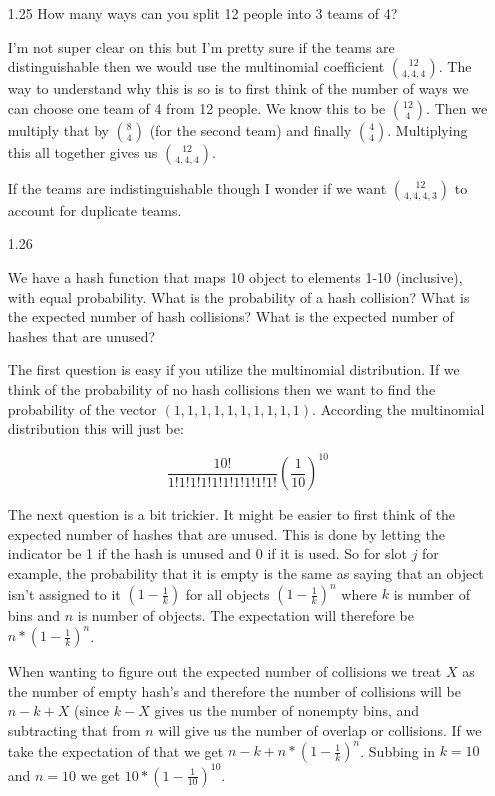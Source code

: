 \begin{enumerate}
\item[1.25]
How many ways can you split 12 people into 3 teams of 4?

I'm not super clear on this but I'm pretty sure if the teams are distinguishable then we would use the multinomial coefficient ${12 \choose 4, 4, 4}$. The way to understand why this is so is to first think of the number of ways we can choose one team of 4 from 12 people. We know this to be  ${12 \choose 4}$. Then we multiply that by  ${8 \choose 4}$ (for the second team) and finally  ${4\choose 4}$. Multiplying this all together gives us  ${12 \choose 4, 4, 4}$.

If the teams are indistinguishable though I wonder if we want ${12 \choose 4, 4, 4, 3}$ to account for duplicate teams. 


\item[1.26]

We have a hash function that maps 10 object to elements 1-10 (inclusive), with equal probability. What is the probability of a hash collision? What is the expected number of hash collisions? What is the expected number of hashes that are unused?

The first question is easy if you utilize the multinomial distribution. If we think of the probability of no hash collisions then we want to find the probability of the vector $(1,1,1,1,1,1,1,1,1,1)$. According the multinomial distribution this will just be:

\begin{equation}
\frac{10!}{1!1!1!1!1!1!1!1!1!1!} (\frac{1}{10})^{10}
\end{equation} 

The next question is a bit trickier. It might be easier to first think of the expected number of hashes that are unused. This is done by letting the indicator be 1 if the hash is unused and 0 if it is used. So for slot $j$ for example, the probability that it is empty is the same as saying that an object isn't assigned to it $(1-\frac{1}{k})$ for all objects $(1-\frac{1}{k})^n$ where $k$ is number of bins and $n$ is number of objects. The expectation will therefore be $n*(1-\frac{1}{k})^n$.

When wanting to figure out the expected number of collisions we treat $X$ as the number of empty hash's and therefore the number of collisions will be $n - k + X$ (since $k-X$ gives us the number of nonempty bins, and subtracting that from $n$ will give us the number of overlap or collisions. If we take the expectation of that we get $n - k + n*(1-\frac{1}{k})^n$. Subbing in $k=10$ and $n=10$ we get $10*(1 - \frac{1}{10})^{10}$. 



\end{enumerate}
